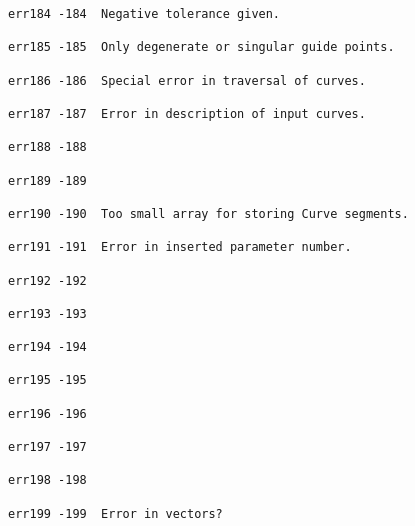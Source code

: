 \begin{verbatim}
err184 -184  Negative tolerance given.

err185 -185  Only degenerate or singular guide points.

err186 -186  Special error in traversal of curves.

err187 -187  Error in description of input curves.

err188 -188

err189 -189

err190 -190  Too small array for storing Curve segments.

err191 -191  Error in inserted parameter number.

err192 -192

err193 -193

err194 -194

err195 -195

err196 -196

err197 -197

err198 -198

err199 -199  Error in vectors?
\end{verbatim}
